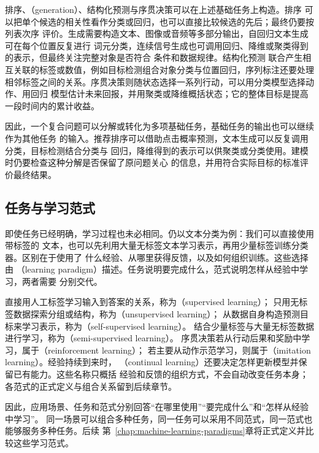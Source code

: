 排序、（generation）、结构化预测与序贯决策可以在上述基础任务上构造。排序
可以把单个候选的相关性看作分类或回归，也可以直接比较候选的先后；最终仍要按列表次序
评价。生成需要构造文本、图像或音频等多部分输出，自回归文本生成可在每个位置反复进行
词元分类，连续信号生成也可调用回归、降维或聚类得到的表示，但最终关注完整对象是否符合
条件和数据规律。结构化预测
联合产生相互关联的标签或数值，例如目标检测组合对象分类与位置回归，序列标注还要处理
相邻标签之间的关系。序贯决策则随状态选择一系列行动，可以用分类模型选择动作、用回归
模型估计未来回报，并用聚类或降维概括状态；它的整体目标是提高一段时间内的累计收益。

因此，一个复合问题可以分解或转化为多项基础任务，基础任务的输出也可以继续作为其他任务
的输入。推荐排序可以借助点击概率预测，文本生成可以反复调用分类，目标检测结合分类与
回归，降维得到的表示可以供聚类或分类使用。建模时仍要检查这种分解是否保留了原问题关心
的信息，并用符合实际目标的标准评价最终结果。

\subsection{任务与学习范式}
\label{sec:task-and-learning-paradigm}

即使任务已经明确，学习过程也未必相同。仍以文本分类为例：我们可以直接使用带标签的
文本，也可以先利用大量无标签文本学习表示，再用少量标签训练分类器。区别在于使用了
什么经验、从哪里获得反馈，以及如何组织训练。这些选择由
（learning paradigm）描述。任务说明要完成什么，范式说明怎样从经验中学习，两者需要
分别交代。

直接用人工标签学习输入到答案的关系，称为（supervised learning）；
只用无标签数据探索分组或结构，称为（unsupervised learning）；
从数据自身构造预测目标来学习表示，称为（self-supervised learning）。
结合少量标签与大量无标签数据进行学习，称为（semi-supervised learning）。
序贯决策若从行动后果和奖励中学习，属于（reinforcement learning）；
若主要从动作示范学习，则属于（imitation learning）。经验持续到来时，
（continual learning）还要决定怎样更新模型并保留已有能力。这些名称只概括
经验和反馈的组织方式，不会自动改变任务本身；各范式的正式定义与组合关系留到后续章节。

因此，应用场景、任务和范式分别回答“在哪里使用”“要完成什么”和“怎样从经验中学习”。
同一场景可以组合多种任务，同一任务可以采用不同范式，同一范式也能够服务多种任务。后续
第~\ref{chap:machine-learning-paradigms}章将正式定义并比较这些学习范式。

